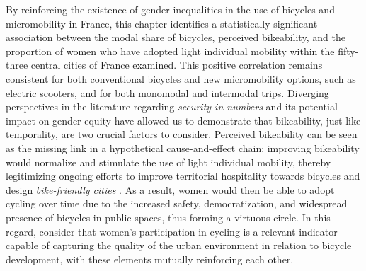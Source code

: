 \begin{refsegment}
By reinforcing the existence of gender inequalities in the use of bicycles and micromobility in France, this chapter identifies a statistically significant association between the modal share of bicycles, perceived bikeability, and the proportion of women who have adopted light individual mobility within the fifty-three central cities of France examined. This positive correlation remains consistent for both conventional bicycles and new micromobility options, such as electric scooters, and for both monomodal and intermodal trips. Diverging perspectives in the literature regarding \textsl{security in numbers} and its potential impact on gender equity have allowed us to demonstrate that bikeability, just like temporality, are two crucial factors to consider. Perceived bikeability can be seen as the missing link in a hypothetical cause-and-effect chain: improving bikeability would normalize and stimulate the use of light individual mobility, thereby legitimizing ongoing efforts to improve territorial hospitality towards bicycles and design \textsl{bike-friendly cities} \textcolor{blue}{\autocite[10]{bourdeau-lepage_reveler_2022}}. As a result, women would then be able to adopt cycling over time due to the increased safety, democratization, and widespread presence of bicycles in public spaces, thus forming a virtuous circle. In this regard, \textcolor{blue}{\textcite[64]{garrard_revolutions_2006}} consider that women's participation in cycling is a relevant indicator capable of capturing the quality of the urban environment in relation to bicycle development, with these elements mutually reinforcing each other.%


\end{refsegment}
